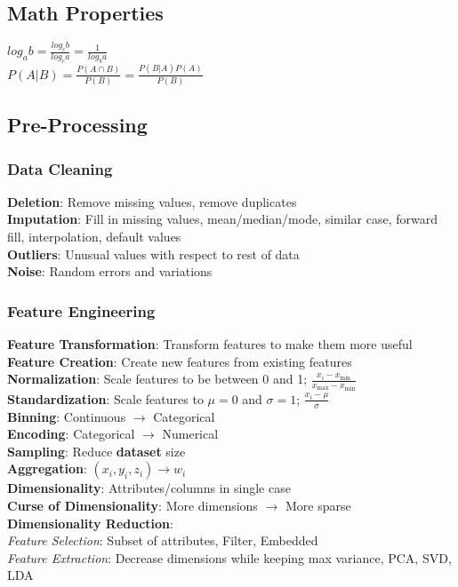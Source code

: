 \documentclass{article}
\author{Ian Chen}
\date{\today}
\begin{document}
    \begin{multicols*}{2}
        \subsection*{Math Properties}
        $log_a b = \frac{log_c b}{log_c a} = \frac{1}{log_b a}$\\
        $P(A|B) = \frac{P(A \cap B)}{P(B)} = \frac{P(B|A)P(A)}{P(B)}$\\
        \subsection*{Pre-Processing}
        \subsubsection*{Data Cleaning}
        \textbf{Deletion}: Remove missing values, remove duplicates\\
        \textbf{Imputation}: Fill in missing values, mean/median/mode, similar case, forward fill,
        interpolation, default values\\
        \textbf{Outliers}: Unusual values with respect to rest of data\\
        \textbf{Noise}: Random errors and variations\\
        \subsubsection*{Feature Engineering}
        \textbf{Feature Transformation}: Transform features to make them more useful\\
        \textbf{Feature Creation}: Create new features from existing features\\
        \textbf{Normalization}: Scale features to be between 0 and 1; $\frac{x_i - x_{\min}}{x_
                {\max} - x_{\min}}$\\
        \textbf{Standardization}: Scale features to $\mu = 0$ and $\sigma = 1$; $\frac{x_i - \mu}{
            \sigma}$\\
        \textbf{Binning}: Continuous $\to$ Categorical\\
        \textbf{Encoding}: Categorical $\to$ Numerical\\
        \textbf{Sampling}: Reduce \textbf{dataset} size\\
        \textbf{Aggregation}: $(x_i, y_i, z_i) \to w_i$\\
        \textbf{Dimensionality}: Attributes/columns in single case\\
        \textbf{Curse of Dimensionality}: More dimensions $\to$ More sparse\\
        \textbf{Dimensionality Reduction}:\\
        \textit{Feature Selection}: Subset of attributes, Filter, Embedded\\
        \textit{Feature Extraction}: Decrease dimensions while keeping max variance, PCA, SVD, LDA\\

\end{multicols*}
\end{document}
